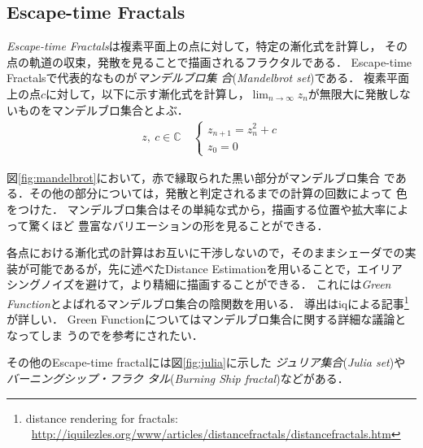 \subsection{Escape-time Fractals}

\textit{Escape-time Fractals}は複素平面上の点に対して，特定の漸化式を計算し，
その点の軌道の収束，発散を見ることで描画されるフラクタルである．
Escape-time Fractalsで代表的なものが\emph{マンデルブロ集
合}(\textit{Mandelbrot set})である．
複素平面上の点$c$に対して，以下に示す漸化式を計算し，$\displaystyle \lim_{n
\to \infty} z_n$が無限大に発散しないものをマンデルブロ集合とよぶ．
\begin{align*}
 z,~c \in \mathbb{C} \quad
 \begin{cases}
  z_{n+1} = z^2_{n} + c \\ z_0 = 0
 \end{cases}
\end{align*}

図\ref{fig:mandelbrot}において，赤で縁取られた黒い部分がマンデルブロ集合
である．その他の部分については，発散と判定されるまでの計算の回数によって
色をつけた．
マンデルブロ集合はその単純な式から，描画する位置や拡大率によって驚くほど
豊富なバリエーションの形を見ることができる．

各点における漸化式の計算はお互いに干渉しないので，そのままシェーダでの実
装が可能であるが，先に述べたDistance Estimationを用いることで，エイリア
シングノイズを避けて，より精細に描画することができる．
これには\textit{Green Function}とよばれるマンデルブロ集合の陰関数を用いる．
導出はiqによる記事\footnote{distance rendering for fractals:
~\url{http://iquilezles.org/www/articles/distancefractals/distancefractals.htm}}
が詳しい．
Green Functionについてはマンデルブロ集合に関する詳細な議論となってしま
うので\cite{douady1984exploring}を参考にされたい．

その他のEscape-time fractalには図\ref{fig:julia}に示した
\emph{ジュリア集合}(\textit{Julia set})や\emph{バーニングシップ・フラク
タル}(\textit{Burning Ship fractal})などがある．

